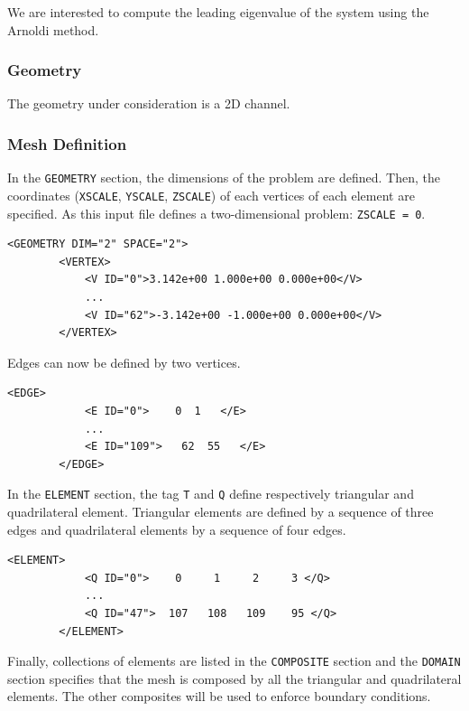   We are interested to compute the leading eigenvalue of the system using the Arnoldi method.

  \subsubsection{Geometry}

   The geometry under consideration is a 2D channel.

   \subsubsection{Mesh Definition}

   In the \texttt{GEOMETRY} section, the dimensions of the problem are defined. Then, the coordinates (\texttt{XSCALE}, \texttt{YSCALE}, \texttt{ZSCALE}) of each vertices of each element are specified. As this input file defines a two-dimensional problem: \texttt{ZSCALE = 0}.

  \begin{lstlisting}[style=XMLStyle]
<GEOMETRY DIM="2" SPACE="2">
        <VERTEX>
            <V ID="0">3.142e+00 1.000e+00 0.000e+00</V>
            ...
            <V ID="62">-3.142e+00 -1.000e+00 0.000e+00</V>
        </VERTEX>
\end{lstlisting}

Edges can now be defined by two vertices.

  \begin{lstlisting}[style=XMLStyle]
<EDGE>
            <E ID="0">    0  1   </E>
            ...
            <E ID="109">   62  55   </E>
        </EDGE>
\end{lstlisting}


In the \texttt{ELEMENT} section, the tag \texttt{T} and \texttt{Q} define respectively triangular and quadrilateral element. Triangular elements are defined by a sequence of three edges and quadrilateral elements by a sequence of four edges.

  \begin{lstlisting}[style=XMLStyle]
        <ELEMENT>
            <Q ID="0">    0     1     2     3 </Q>
            ...
            <Q ID="47">  107   108   109    95 </Q>
        </ELEMENT>
        \end{lstlisting}

Finally, collections of elements are listed in the \texttt{COMPOSITE} section and the \texttt{DOMAIN} section specifies that the mesh is composed by all the triangular and quadrilateral elements. The other composites will be used to enforce boundary conditions.

